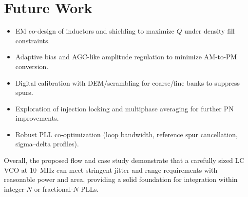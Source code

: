 \section{Future Work}
\begin{itemize}
  \item EM co-design of inductors and shielding to maximize $Q$ under density fill constraints.
  \item Adaptive bias and AGC-like amplitude regulation to minimize AM-to-PM conversion.
  \item Digital calibration with DEM/scrambling for coarse/fine banks to suppress spurs.
  \item Exploration of injection locking and multiphase averaging for further PN improvements.
  \item Robust PLL co-optimization (loop bandwidth, reference spur cancellation, sigma--delta profiles).
\end{itemize}

Overall, the proposed flow and case study demonstrate that a carefully sized LC VCO at \SI{10}{\mega\hertz} can meet stringent jitter and range requirements with reasonable power and area, providing a solid foundation for integration within integer-$N$ or fractional-$N$ PLLs.



